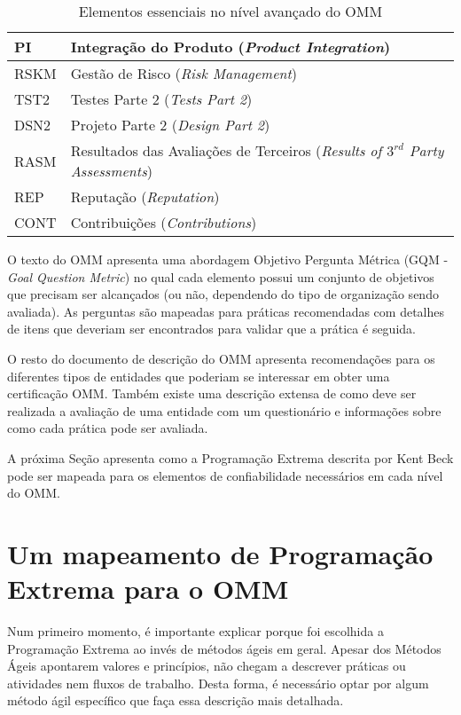 \begin{table}
  \centering
  \begin{tabular}{|p{2cm}|p{13cm}|}
    \hline
    PI & Integração do Produto
    (\textit{Product Integration}) \\
    \hline
    RSKM & Gestão de Risco
    (\textit{Risk Management}) \\
    \hline
    TST2 & Testes Parte 2
    (\textit{Tests Part 2}) \\
    \hline
    DSN2 & Projeto Parte 2
    (\textit{Design Part 2}) \\
    \hline
    RASM & Resultados das Avaliações de Terceiros
    (\textit{Results of $3^{rd}$ Party Assessments}) \\
    \hline
    REP & Reputação
    (\textit{Reputation}) \\
    \hline
    CONT & Contribuições
    (\textit{Contributions}) \\
    \hline
  \end{tabular}
  \caption{Elementos essenciais no nível avançado do OMM}
  \label{tab:omm-advanced}
\end{table}

O texto do OMM apresenta uma abordagem Objetivo Pergunta Métrica (GQM
- \textit{Goal Question Metric}) no qual cada elemento possui um
conjunto de objetivos que precisam ser alcançados (ou não, dependendo
do tipo de organização sendo avaliada). As perguntas são mapeadas para
práticas recomendadas com detalhes de itens que deveriam ser
encontrados para validar que a prática é seguida.

O resto do documento de descrição do OMM apresenta recomendações para
os diferentes tipos de entidades que poderiam se interessar em obter
uma certificação OMM. Também existe uma descrição extensa de como deve
ser realizada a avaliação de uma entidade com um questionário e
informações sobre como cada prática pode ser avaliada.

A próxima Seção apresenta como a Programação Extrema descrita por Kent
Beck pode ser mapeada para os elementos de confiabilidade necessários
em cada nível do OMM.

\section{Um mapeamento de Programação Extrema para o OMM}
\label{sec:xp-em-omm}

Num primeiro momento, é importante explicar porque foi escolhida a
Programação Extrema ao invés de métodos ágeis em geral. Apesar dos
Métodos Ágeis apontarem valores e princípios, não chegam a descrever
práticas ou atividades nem fluxos de trabalho. Desta forma, é
necessário optar por algum método ágil específico que faça essa
descrição mais detalhada.

